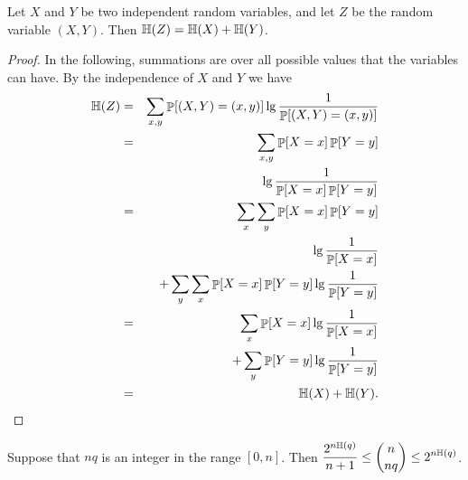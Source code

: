 \begin{lemma}
    Let $X$ and $Y$ be two independent random variables, and let $Z$
    be the random variable $(X,Y)$. Then
    $\Entropy{Z} = \Entropy{X} + \Entropy{Y}$.
\end{lemma}

\begin{proof}
    In the following, summations are over all possible values that the
    variables can have. By the independence of $X$ and $Y$ we have
    \begin{eqnarray*}
        \Entropy{Z} &=& \sum_{x,y} \Prob{ (X,Y) = (x,y)} \lg 
        \frac{1}{\Prob{ (X,Y) = (x,y)}} \\
        &= &
        \sum_{x,y} \Prob{ X = x} \Prob{Y = y} \\
        && \lg 
        \frac{1}{\Prob{ X = x} \Prob{ Y = y } } \\
        &= &
        \sum_x \sum_{y} \Prob{ X = x} \Prob{Y = y} \\
        && \lg 
        \frac{1}{\Prob{ X = x}  } 
        \\
        && + \sum_{y} \sum_x \Prob{ X = x} \Prob{Y = y} \lg 
        \frac{1}{\Prob{ Y = y } } \\
        &=& 
        \sum_x \Prob{ X = x} \lg 
        \frac{1}{\Prob{ X = x}  } \\
        && + \sum_{y}  \Prob{Y = y} \lg 
        \frac{1}{\Prob{ Y = y } } \\
        &=& \Entropy{X} + \Entropy{Y}.
    \end{eqnarray*}
\end{proof}

\begin{lemma}
    Suppose that $nq$ is an integer in the range $[0,n]$. Then
    $\displaystyle \frac{2^{n\EntropyX{q}}}{n+1} \leq \binom{n}{nq}
    \leq 2^{n \EntropyX{q}}$.

\end{lemma}

